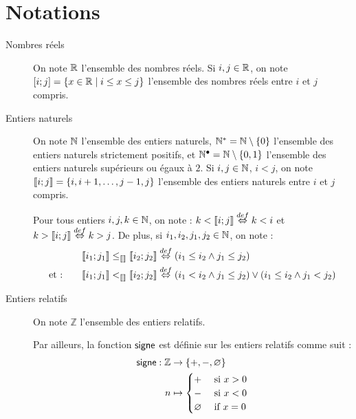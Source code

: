\section{Notations}

\begin{description}
  \item[Nombres réels]
    On note $\mathbb{R}$ l'ensemble des nombres réels.
    Si $i, j \in \mathbb{R}$, on note $\mathopen{[}i\mathclose{};j\mathclose{]} = \{ x \in \mathbb{R} \mid i \leq x \leq j \}$
    l'ensemble des nombres réels entre $i$ et $j$ compris.
  
  \item[Entiers naturels]
    On note $\mathbb{N}$ l'ensemble des entiers naturels,
    $\mathbb{N}^* = \mathbb{N} \setminus \{ 0 \}$ l'ensemble des entiers naturels strictement positifs,
    et $\mathbb{N}^\bullet = \mathbb{N} \setminus \{ 0, 1 \}$ l'ensemble des entiers naturels
    supérieurs ou égaux à $2$.
    Si $i, j \in \mathbb{N}$, $i < j$, on note $\mathopen{\llbracket}i\mathclose{};j\mathclose{\rrbracket} = \{ i, i+1, \ldots, j-1, j \}$
    l'ensemble des entiers naturels entre $i$ et $j$ compris.
    
    Pour tous entiers $i, j, k \in \mathbb{N}$, on note :
    $k < \mathopen{\llbracket}i\mathclose{};j\mathclose{\rrbracket} \stackrel{def}\Leftrightarrow k < i$ et $k > \mathopen{\llbracket}i\mathclose{};j\mathclose{\rrbracket} \stackrel{def}\Leftrightarrow k > j$.
    De plus, si $i_1, i_2, j_1, j_2 \in \mathbb{N}$, on note :
    \begin{align*}
      \mathopen{\llbracket}i_1\mathclose{};j_1\mathclose{\rrbracket} \leq_{\llbracket\rrbracket} \mathopen{\llbracket}i_2\mathclose{};j_2\mathclose{\rrbracket} &\stackrel{def}\Leftrightarrow (i_1 \leq i_2 \wedge j_1 \leq j_2) \\
      \text{et :} \qquad \mathopen{\llbracket}i_1\mathclose{};j_1\mathclose{\rrbracket} <_{\llbracket\rrbracket} \mathopen{\llbracket}i_2\mathclose{};j_2\mathclose{\rrbracket}
        &\stackrel{def}\Leftrightarrow (i_1<i_2 \wedge j_1\leq j_2) \vee (i_1\leq i_2\wedge j_1 < j_2)
    \end{align*}
  
  \item[Entiers relatifs]
    On note $\mathbb{Z}$ l'ensemble des entiers relatifs.
    
    Par ailleurs, la fonction $\mathsf{signe}$ est définie sur les entiers relatifs comme suit :
    \begin{align*}
      \mathsf{signe} : \mathbb{Z} &\rightarrow \{ +, -, \varnothing \} \\
      n & \mapsto \begin{cases}
        + & \text{ si $x > 0$} \\
        - & \text{ si $x < 0$} \\
        \varnothing & \text{ if $x = 0$}
      \end{cases}
    \end{align*}
  

\end{description}
